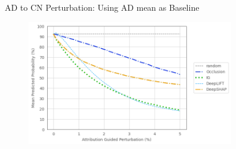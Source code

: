 \documentclass[aspectratio=169,xcolor={table, dvipsnames}]{beamer}
\begin{document}
\begin{frame}{AD to CN Perturbation: Using AD mean as Baseline}
	\begin{figure}
		\centering
		\includegraphics[width=0.8\textwidth]{figures/3672-ad-fidelity-cn2.png}
	\end{figure}
\end{frame}

% 
\end{document}
